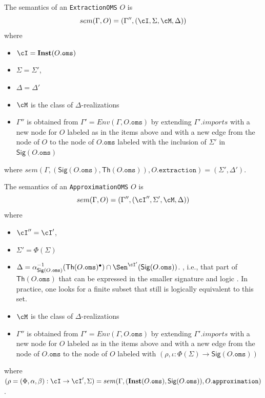 \documentclass[10pt, a4paper]{isov2}
\newcommand*{\syntax}[1]{\texttt{#1}}
\newcommand{\Sig}{\mathsf{Sig}}
\renewcommand{\Th}{\mathsf{Th}}
\newcommand{\Inst}{\ensuremath{\mathbf{Inst}}}
\begin{document}
The semantics of an \syntax{ExtractionOMS} $O$
is
$$sem(\Gamma, O) = (\Gamma'',(\cI,\Sigma,\cM,\Delta))$$
\noindent where
\begin{itemize}
  \item $\cI = \Inst(O.\syntax{oms})$
  \item $\Sigma = \Sigma'$,
  \item $\Delta = \Delta'$
  \item $\cM$ is the class of $\Delta$-realizations
  \item $\Gamma''$ is obtained from
       $\Gamma' = Env(\Gamma, O.\syntax{oms})$
       by extending $\Gamma'.imports$
        with a new node for $O$ labeled as in the items above
        and with a new edge from the node of $O$ to the node of
        $O.\syntax{oms}$ labeled with
        the inclusion of $\Sigma'$ in $\Sig(O.\syntax{oms})$
\end{itemize}
where
$sem(\Gamma, (\Sig(O.\syntax{oms}), \Th(O.\syntax{oms})), O.\syntax{extraction}) =
(\Sigma',\Delta')$.

The semantics of an \syntax{ApproximationOMS} $O$ is
$$sem(\Gamma, O) = (\Gamma'',(\cI'',\Sigma',\cM,\Delta))$$
\noindent where
\begin{itemize}
  \item $\cI'' = \cI'$,
  \item $\Sigma' = \Phi(\Sigma)$
  \item $\Delta = \alpha^{-1}_{\Sig(O.\syntax{oms})}(\Th(O.\syntax{oms})^\bullet)\cap\Sen^{\cI'}(\Sig(O.\syntax{oms}))$.
, i.e., that part of $\Th(O.\syntax{oms})$ that can be expressed in the smaller signature and logic . In  practice, one looks for a finite subset that still is logically equivalent to this set.
  \item $\cM$ is the class of $\Delta$-realizations
  \item $\Gamma''$ is obtained from
       $\Gamma' = Env(\Gamma, O.\syntax{oms})$
       by extending $\Gamma'.imports$
        with a new node for $O$ labeled as in the items above
        and with a new edge from the node of $O.\syntax{oms}$ to the node of $O$
        labeled with $(\rho,\iota: \Phi(\Sigma) \to \Sig(O.\syntax{oms}))$
\end{itemize}
\noindent where $(\rho = (\Phi,\alpha,\beta):\cI\to\cI',\Sigma) = sem(\Gamma, (\Inst(O.\syntax{oms}), \Sig(O.\syntax{oms})), O.\syntax{approximation})$.
\end{document}
